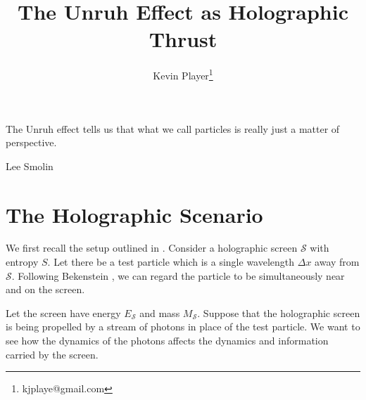 \documentclass[12pt,a4paper]{article}
\begin{document}
\title{The Unruh Effect as Holographic Thrust}
\author[1]{Kevin Player\footnote{kjplaye@gmail.com}}

\maketitle

\epigraph{The Unruh effect tells us that what we call particles is really just a matter of perspective.}{Lee Smolin}



\section{The Holographic Scenario}
We first recall the setup outlined in \cite{entropic}. Consider a holographic screen $\mathscr{S}$ with entropy $S$.  Let there be a test particle which is a single wavelength $\Delta x$ away from $\mathscr{S}$.  Following Bekenstein \cite{bekenstein}, we can regard the particle to be simultaneously near and on the screen.

Let the screen have energy $E_\mathscr{S}$ and mass $M_\mathscr{S}$.  Suppose that the holographic screen is being propelled by a stream of photons in place of the test particle.  We want to see how the dynamics of the photons affects the dynamics and information carried by the screen.
\end{document}
